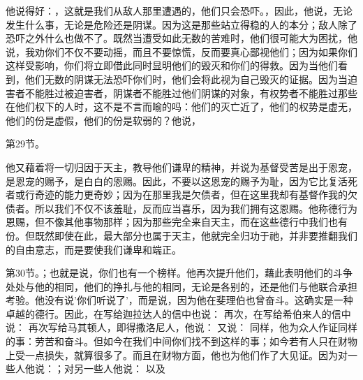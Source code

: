 他说得好：，这就是我们从敌人那里遭遇的，他们只会恐吓。，因此，他说，无论发生什么事，无论是危险还是阴谋。因为这是那些站立得稳的人的本分；敌人除了恐吓之外什么也做不了。既然当遭受如此无数的苦难时，他们很可能大为困扰，他说，我劝你们不仅不要动摇，而且不要惊慌，反而要真心鄙视他们；因为如果你们这样受影响，你们将立即借此同时显明他们的毁灭和你们的得救。因为当他们看到，他们无数的阴谋无法恐吓你们时，他们会将此视为自己毁灭的证据。因为当迫害者不能胜过被迫害者，阴谋者不能胜过他们阴谋的对象，有权势者不能胜过那些在他们权下的人时，这不是不言而喻的吗：他们的灭亡近了，他们的权势是虚无，他们的份是虚假，他们的份是软弱的？他说，\par

第29节。\par

他又藉着将一切归因于天主，教导他们谦卑的精神，并说为基督受苦是出于恩宠，是恩宠的赐予，是白白的恩赐。因此，不要以这恩宠的赐予为耻，因为它比复活死者或行奇迹的能力更奇妙；因为在那里我是欠债者，但在这里我却有基督作我的欠债者。所以我们不仅不该羞耻，反而应当喜乐，因为我们拥有这恩赐。他称德行为恩赐，但不像其他事物那样；因为那些完全来自天主，而在这些德行中我们也有份。但既然即使在此，最大部分也属于天主，他就完全归功于祂，并非要推翻我们的自由意志，而是要使我们谦卑和端正。\par

第30节。；也就是说，你们也有一个榜样。他再次提升他们，藉此表明他们的斗争处处与他的相同，他们的挣扎与他的相同，无论是各别的，还是他们与他联合承担考验。他没有说'你们听说了'，而是说，因为他在斐理伯也曾奋斗。这确实是一种卓越的德行。因此，在写给迦拉达人的信中也说： 再次，在写给希伯来人的信中说： 再次写给马其顿人，即得撒洛尼人，他说： 又说： 同样，他为众人作证同样的事：劳苦和奋斗。但如今在我们中间你们找不到这样的事；如今若有人只在财物上受一点损失，就算很多了。而且在财物方面，他也为他们作了大见证。因为对一些人他说：；对另一些人他说： 以及\par

